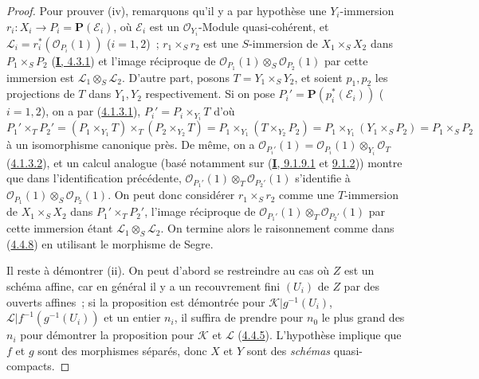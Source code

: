 \begin{proof}
Pour prouver (iv), remarquons qu'il y a par hypothèse une $Y_i$-immersion
$r_i:X_i\to P_i=\mathbf{P}(\mathcal{E}_i)$, où $\mathcal{E}_i$ est un
$\mathcal{O}_{Y_i}$-Module quasi-cohérent, et
$\mathcal{L}_i=r_i^*(\mathcal{O}_{P_i}(1))$ ($i=1,2$)~;
$r_1\times_Sr_2$ est une $S$-immersion de $X_1\times_SX_2$ dans
$P_1\times_SP_2$ (\hyperref[I.4.3.1-fr]{\textbf{I}, 4.3.1}) et l'image réciproque de
$\mathcal{O}_{P_1}(1)\otimes_S\mathcal{O}_{P_2}(1)$ par cette immersion est
$\mathcal{L}_1\otimes_S\mathcal{L}_2$. D'autre part, posons
$T=Y_1\times_SY_2$, et soient $p_1,p_2$ les projections de $T$ dans $Y_1,Y_2$
respectivement. Si on pose
$P_i'=\mathbf{P}(p_i^*(\mathcal{E}_i))$ ($i=1,2$), on a par
(\hyperref[II.4.1.3.1-fr]{4.1.3.1}), $P_i'=P_i\times_{Y_i}T$ d'où
\[
  P_1'\times_TP_2'
  =(P_1\times_{Y_1}T)\times_T(P_2\times_{Y_2}T)
  =P_1\times_{Y_1}(T\times_{Y_2}P_2)
  =P_1\times_{Y_1}(Y_1\times_SP_2)
  =P_1\times_SP_2
\]
à un isomorphisme canonique près. De même, on a
$\mathcal{O}_{P_i'}(1)=\mathcal{O}_{P_i}(1)\otimes_{Y_i}\mathcal{O}_T$
(\hyperref[II.4.1.3.2-fr]{4.1.3.2}), et un calcul analogue (basé notamment
sur (\hyperref[I.9.1.9.1-fr]{\textbf{I}, 9.1.9.1} et
\hyperref[I.9.1.2-fr]{9.1.2})) montre que dans l'identification précédente,
$\mathcal{O}_{P_1'}(1)\otimes_T\mathcal{O}_{P_2'}(1)$ s'identifie à
$\mathcal{O}_{P_1}(1)\otimes_S\mathcal{O}_{P_2}(1)$. On peut donc considérer
$r_1\times_Sr_2$ comme une $T$-immersion de $X_1\times_SX_2$ dans
$P_1'\times_TP_2'$, l'image réciproque de
$\mathcal{O}_{P_1'}(1)\otimes_T\mathcal{O}_{P_2'}(1)$ par cette immersion
étant $\mathcal{L}_1\otimes_S\mathcal{L}_2$. On termine alors le raisonnement
comme dans (\hyperref[II.4.4.8-fr]{4.4.8}) en utilisant le morphisme de Segre.

Il reste à démontrer (ii). On peut d'abord se restreindre au cas où $Z$ est un
schéma affine, car en général il y a un recouvrement fini $(U_i)$ de $Z$ par
des ouverts affines~; si la proposition est démontrée pour
$\mathcal{K}|g^{-1}(U_i)$, $\mathcal{L}|f^{-1}(g^{-1}(U_i))$ et un entier
$n_i$, il suffira de prendre pour $n_0$ le plus grand des $n_i$ pour démontrer
la proposition pour $\mathcal{K}$ et $\mathcal{L}$
(\hyperref[II.4.4.5-fr]{4.4.5}). L'hypothèse implique que $f$ et $g$ sont des
morphismes séparés, donc $X$ et $Y$ sont des \emph{schémas} quasi-compacts.


\end{proof}
